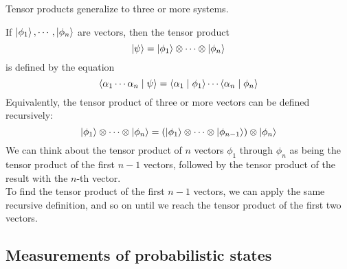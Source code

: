 \documentclass{report}
\begin{document}

Tensor products generalize to three or more systems.

\bigbreak

If $\ket{\phi_1},\cdots,\ket{\phi_n}$ are vectors, then the tensor product
\begin{equation*}
    \ket{\psi}=\ket{\phi_1}\otimes\cdots\otimes\ket{\phi_n}
\end{equation*}
is defined by the equation 
\begin{equation*}
    \braket{\alpha_1\cdots\alpha_n\mid\psi}=\braket{\alpha_1\mid\phi_1}\cdots\braket{\alpha_n\mid\phi_n}
\end{equation*}
Equivalently, the tensor product of three or more vectors can be defined recursively:
\begin{equation*}
    \ket{\phi_1}\otimes\cdots\otimes\ket{\phi_n}=(\ket{\phi_1}\otimes\cdots\otimes\ket{\phi_{n-1}})\otimes\ket{\phi_n}
\end{equation*}
We can think about the tensor product of $n$ vectors $\phi_1$ through $\phi_n$ as being the tensor product of the first $n-1$ vectors, followed by the tensor product of the result with the $n$-th vector.\\[1em]
To find the tensor product of the first $n-1$ vectors, we can apply the same recursive definition, and so on until we reach the tensor product of the first two vectors.


\subsection{Measurements of probabilistic states}
\end{document}
